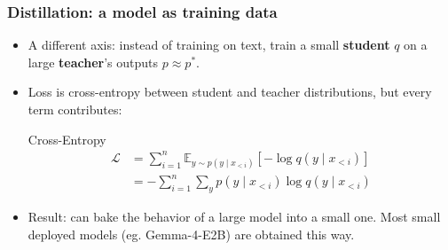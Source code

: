 \begin{frame}
\frametitle{Distillation: a model as training data}
\begin{itemize}
    \item A different axis: instead of training on text, train a small
    \textbf{student} $q$ on a large \textbf{teacher}'s outputs $p \approx p^*$.
    \pause
    \item Loss is cross-entropy between student and teacher
    distributions, but every term contributes:
    \begin{block}{Cross-Entropy}
        \begin{align*}
        \mathcal{L} &= \sum_{i=1}^n \mathbb{E}_{y \sim p(y \mid x_{<i})} 
        \left[ - \log q(y \mid x_{<i}) \right] \\
        &= - \sum_{i=1}^n \sum_{y} p(y \mid x_{<i}) \log q(y \mid x_{<i})
        \end{align*}
    \end{block}
    \pause
    \item Result: can bake the behavior of a large model into a small one.
    Most small deployed models (eg. Gemma-4-E2B) are obtained this way.
\end{itemize}
\end{frame}



